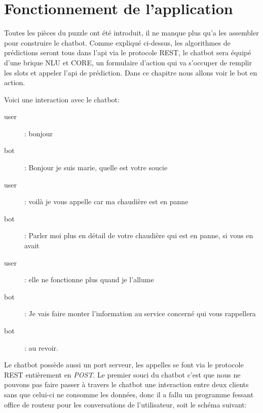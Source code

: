 
\chapter{Fonctionnement de l'application}
Toutes les pièces du puzzle ont été introduit, il ne manque plus qu'a les assembler pour construire le chatbot. Comme expliqué ci-dessus, les algorithmes de prédictions seront tous dans l'api via le protocole REST, le chatbot sera équipé d'une brique NLU et CORE, un formulaire d'action qui va s'occuper de remplir les slots et appeler l'api de prédiction.\linebreak
Dans ce chapitre nous allons voir le bot en action.

Voici une interaction avec le chatbot:

\begin{description}
\item[user]: bonjour
\item[bot]: Bonjour je suis marie, quelle est votre soucie
\item[user]: voilà je vous appelle car ma chaudière est en panne
\item[bot]: Parler moi plus en détail de votre chaudière qui est en panne, si vous en avait
\item[user]: elle ne fonctionne plus quand je l'allume
\item[bot]: Je vais faire monter l'information au service concerné qui vous rappellera
\item[bot]: au revoir.	
\end{description}

Le chatbot possède aussi un port serveur, les appelles se font via le protocole REST entièrement en \textit{POST}.\linebreak
Le premier souci du chatbot c'est que nous ne pouvons pas faire passer à travers le chatbot une interaction entre deux clients sans que celui-ci ne consomme les données, donc il a fallu un programme fessant office de routeur pour les conversations de l'utilisateur, soit le schéma suivant:

